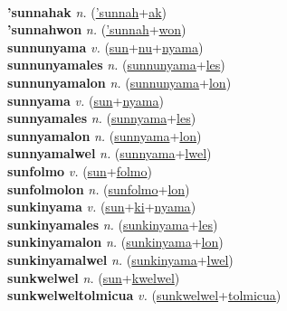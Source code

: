  \label{'sunnah} \\
\textbf{'sunnahak} \textit{n.} (\hyperref['sunnah]{'sunnah}+\hyperref[ak]{ak})
 \label{'sunnahak} \\
\textbf{'sunnahwon} \textit{n.} (\hyperref['sunnah]{'sunnah}+\hyperref[won]{won})
 \label{'sunnahwon} \\
\textbf{sunnunyama} \textit{v.} (\hyperref[sun]{sun}+\hyperref[nu]{nu}+\hyperref[nyama]{nyama})
 \label{sunnunyama} \\
\textbf{sunnunyamales} \textit{n.} (\hyperref[sunnunyama]{sunnunyama}+\hyperref[les]{les})
 \label{sunnunyamales} \\
\textbf{sunnunyamalon} \textit{n.} (\hyperref[sunnunyama]{sunnunyama}+\hyperref[lon]{lon})
 \label{sunnunyamalon} \\
\textbf{sunnyama} \textit{v.} (\hyperref[sun]{sun}+\hyperref[nyama]{nyama})
 \label{sunnyama} \\
\textbf{sunnyamales} \textit{n.} (\hyperref[sunnyama]{sunnyama}+\hyperref[les]{les})
 \label{sunnyamales} \\
\textbf{sunnyamalon} \textit{n.} (\hyperref[sunnyama]{sunnyama}+\hyperref[lon]{lon})
 \label{sunnyamalon} \\
\textbf{sunnyamalwel} \textit{n.} (\hyperref[sunnyama]{sunnyama}+\hyperref[lwel]{lwel})
 \label{sunnyamalwel} \\
\textbf{sunfolmo} \textit{v.} (\hyperref[sun]{sun}+\hyperref[folmo]{folmo})
 \label{sunfolmo} \\
\textbf{sunfolmolon} \textit{n.} (\hyperref[sunfolmo]{sunfolmo}+\hyperref[lon]{lon})
 \label{sunfolmolon} \\
\textbf{sunkinyama} \textit{v.} (\hyperref[sun]{sun}+\hyperref[ki]{ki}+\hyperref[nyama]{nyama})
 \label{sunkinyama} \\
\textbf{sunkinyamales} \textit{n.} (\hyperref[sunkinyama]{sunkinyama}+\hyperref[les]{les})
 \label{sunkinyamales} \\
\textbf{sunkinyamalon} \textit{n.} (\hyperref[sunkinyama]{sunkinyama}+\hyperref[lon]{lon})
 \label{sunkinyamalon} \\
\textbf{sunkinyamalwel} \textit{n.} (\hyperref[sunkinyama]{sunkinyama}+\hyperref[lwel]{lwel})
 \label{sunkinyamalwel} \\
\textbf{sunkwelwel} \textit{n.} (\hyperref[sun]{sun}+\hyperref[kwelwel]{kwelwel})
 \label{sunkwelwel} \\
\textbf{sunkwelweltolmicua} \textit{v.} (\hyperref[sunkwelwel]{sunkwelwel}+\hyperref[tolmicua]{tolmicua})
 \label{sunkwelweltolmicua} \\
